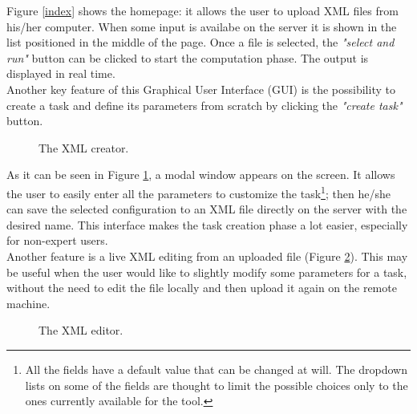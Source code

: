 Figure \ref{index} shows the homepage: it allows the user to upload XML files from his/her computer. When some input is availabe on the server it is shown in the list positioned in the middle of the page. Once a file is selected, the \emph{"select and run"} button can be clicked to start the computation phase. The output is displayed in real time.\\
Another key feature of this Graphical User Interface (GUI) is the possibility to create a task and define its parameters from scratch by clicking the \emph{"create task"} button.

\begin{figure}[H]
  \caption{The XML creator.}
  \label{modal}
\end{figure}  

As it can be seen in Figure \ref{modal}, a modal window appears on the screen. It allows the user to easily enter all the parameters to customize the task\footnote{All the fields have a default value that can be changed at will. The dropdown lists on some of the fields are thought to limit the possible choices only to the ones currently available for the tool.}; then he/she can save the selected configuration to an XML file directly on the server with the desired name. This interface makes the task creation phase a lot easier, especially for non-expert users.\\
Another feature is a live XML editing from an uploaded file (Figure \ref{editor}). This may be useful when the user would like to slightly modify some parameters for a task, without the need to edit the file locally and then upload it again on the remote machine.

\begin{figure}[H]
  \caption{The XML editor.}
  \label{editor}
\end{figure}  